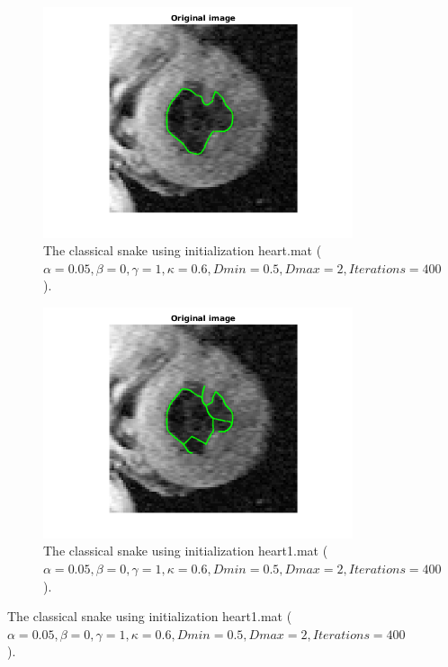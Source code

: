 \documentclass{article}
\begin{document}
\begin{figure}[H]
\centering
\begin{subfigure}{0.49\textwidth}
  \centering
  \includegraphics[width=\linewidth]{fig8a.png}
  \caption{The classical snake using initialization heart.mat ($\alpha=0.05, \beta=0, \gamma=1,\kappa=0.6,Dmin=0.5,Dmax=2, Iterations=400$).}
  \label{fig8a}
\end{subfigure}
\begin{subfigure}{0.49\textwidth}
  \centering
  \includegraphics[width=\linewidth]{fig8b.png}
  \caption{The classical snake using initialization heart1.mat ($\alpha=0.05, \beta=0, \gamma=1,\kappa=0.6,Dmin=0.5,Dmax=2, Iterations=400$).}
  \label{fig8b}
\end{subfigure}

\end{figure}
\end{document}
